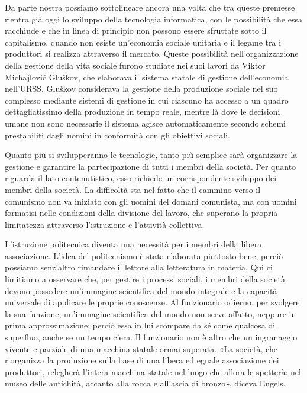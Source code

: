 \documentclass[../main]{subfiles}
\begin{document}
Da parte nostra possiamo sottolineare ancora una volta che tra queste premesse rientra già oggi lo sviluppo della tecnologia informatica, con le possibilità che essa racchiude e che in linea di principio non possono essere sfruttate sotto il capitalismo, quando non esiste un'economia sociale unitaria e il legame tra i produttori si realizza attraverso il mercato. Queste possibilità nell'organizzazione della gestione della vita sociale furono studiate nei suoi lavori da Viktor Michajlovič Gluškov, che elaborava il sistema statale di gestione dell'economia nell'URSS. Gluškov considerava la gestione della produzione sociale nel suo complesso mediante sistemi di gestione in cui ciascuno ha accesso a un quadro dettagliatissimo della produzione in tempo reale, mentre là dove le decisioni umane non sono necessarie il sistema agisce automaticamente secondo schemi prestabiliti dagli uomini in conformità con gli obiettivi sociali.

Quanto più si svilupperanno le tecnologie, tanto più semplice sarà organizzare la gestione e garantire la partecipazione di tutti i membri della società. Per quanto riguarda il lato contenutistico, esso richiede un corrispondente sviluppo dei membri della società. La difficoltà sta nel fatto che il cammino verso il comunismo non va iniziato con gli uomini del domani comunista, ma con uomini formatisi nelle condizioni della divisione del lavoro, che superano la propria limitatezza attraverso l'istruzione e l'attività collettiva.

L'istruzione politecnica diventa una necessità per i membri della libera associazione. L'idea del politecnismo è stata elaborata piuttosto bene, perciò possiamo senz'altro rimandare il lettore alla letteratura in materia. Qui ci limitiamo a osservare che, per gestire i processi sociali, i membri della società devono possedere un'immagine scientifica del mondo integrale e la capacità universale di applicare le proprie conoscenze. Al funzionario odierno, per svolgere la sua funzione, un'immagine scientifica del mondo non serve affatto, neppure in prima approssimazione; perciò essa in lui scompare da sé come qualcosa di superfluo, anche se un tempo c'era. Il funzionario non è altro che un ingranaggio vivente e parziale di una macchina statale ormai superata. «La società, che riorganizza la produzione sulla base di una libera ed eguale associazione dei produttori, relegherà l'intera macchina statale nel luogo che allora le spetterà: nel museo delle antichità, accanto alla rocca e all'ascia di bronzo», diceva Engels.
\end{document}
